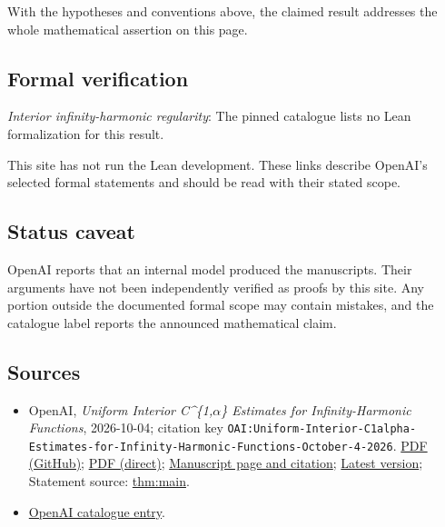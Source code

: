 \documentclass[11pt]{article}
\begin{document}
With the hypotheses and conventions above, the claimed result addresses the whole mathematical assertion on this page.

\subsection{Formal verification}
\textit{Interior infinity-harmonic regularity}: The pinned catalogue lists no Lean formalization for this result.

This site has not run the Lean development. These links describe OpenAI’s selected formal statements and should be read with their stated scope.

\subsection{Status caveat}
OpenAI reports that an internal model produced the manuscripts. Their arguments have not been independently verified as proofs by this site. Any portion outside the documented formal scope may contain mistakes, and the catalogue label reports the announced mathematical claim.

\subsection{Sources}
\begin{itemize}
\item OpenAI, \emph{Uniform Interior C\textasciicircum{}\{1,\(\alpha\)\} Estimates for Infinity-Harmonic Functions}, 2026-10-04; citation key \texttt{OAI:Uniform-Interior-C1alpha-Estimates-for-Infinity-Harmonic-Functions-October-4-2026}. \href{https://github.com/openai/math/blob/adc7f1241b42e322a6451854ab7e4b4c146bf78a/preprints/Uniform-Interior-C1alpha-Estimates-for-Infinity-Harmonic-Functions-October-4-2026/interior-c1-infinity-harmonic.pdf}{PDF (GitHub)}; \href{https://github.com/openai/math/raw/adc7f1241b42e322a6451854ab7e4b4c146bf78a/preprints/Uniform-Interior-C1alpha-Estimates-for-Infinity-Harmonic-Functions-October-4-2026/interior-c1-infinity-harmonic.pdf}{PDF (direct)}; \href{https://github.com/openai/math/blob/adc7f1241b42e322a6451854ab7e4b4c146bf78a/preprints/Uniform-Interior-C1alpha-Estimates-for-Infinity-Harmonic-Functions-October-4-2026/README.md}{Manuscript page and citation}; \href{https://github.com/openai/math/blob/main/preprints/Uniform-Interior-C1alpha-Estimates-for-Infinity-Harmonic-Functions-October-4-2026/interior-c1-infinity-harmonic.pdf}{Latest version}; Statement source: \href{https://github.com/openai/math/blob/adc7f1241b42e322a6451854ab7e4b4c146bf78a/preprints/Uniform-Interior-C1alpha-Estimates-for-Infinity-Harmonic-Functions-October-4-2026/build/manuscript/sections/01-introduction.tex\#L29}{thm:main}.
\item \href{https://github.com/openai/math/blob/adc7f1241b42e322a6451854ab7e4b4c146bf78a/CONTENTS.md}{OpenAI catalogue entry}.
\end{itemize}
\end{document}
